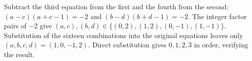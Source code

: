 Subtract the third equation from the first and the fourth from the second: $(a-c)(a+c-1)=-2$ and $(b-d)(b+d-1)=-2$. The integer factor pairs of $-2$ give $(a,c),(b,d)\in\{(0,2),(1,2),(0,-1),(1,-1)\}$. Substitution of the sixteen combinations into the original equations leaves only $\boxed{(a,b,c,d)=(1,0,-1,2)}$. Direct substitution gives $0,1,2,3$ in order, verifying the result.
